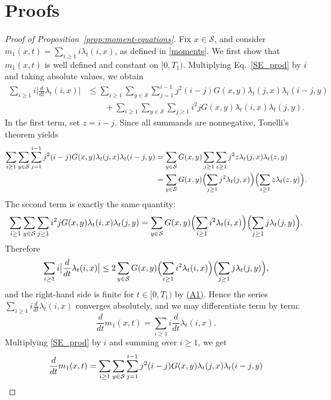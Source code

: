 \documentclass[12pt,twoside]{article}
\begin{document}
\section{Proofs}\label{sec:proofs}
\begin{proof}[Proof of Proposition~\ref{prop:moment-equations}]
Fix $x\in\mathcal S$, and consider
$
m_1(x,t)=\sum_{i\ge1} i\lambda_t(i,x)$, as defined in \eqref{moments}.
We first show that $m_1(x,t)$ is well defined and constant on $[0,T_1)$.
Multiplying Eq.~\eqref{SE_prod} by $i$ and taking absolute values, we obtain
\begin{align*}
\sum_{i\ge1} i\bigl|\frac{d}{dt} \lambda_t(i,x)\bigr|
&\le
\sum_{i\ge1}\sum_{y\in\mathcal S}\sum_{j=1}^{i-1}
j^2(i-j)G(x,y)\lambda_t(j,x)\lambda_t(i-j,y)
\\
&\qquad
+\sum_{i\ge1}\sum_{y\in\mathcal S}\sum_{j\ge1}
i^2j G(x,y)\lambda_t(i,x)\lambda_t(j,y).
\end{align*}
In the first term, set $z=i-j$. Since all summands are nonnegative,
Tonelli's theorem yields
\begin{align*}
\sum_{i\ge1}\sum_{y\in\mathcal S}\sum_{j=1}^{i-1}
j^2(i-j)G(x,y)\lambda_t(j,x)\lambda_t(i-j,y)
&=
\sum_{y\in\mathcal S} G(x,y)
\sum_{j\ge1}\sum_{z\ge1}
j^2 z\lambda_t(j,x)\lambda_t(z,y)
\\
&=
\sum_{y\in\mathcal S} G(x,y)
\Bigl(\sum_{j\ge1} j^2\lambda_t(j,x)\Bigr)
\Bigl(\sum_{z\ge1} z\lambda_t(z,y)\Bigr).
\end{align*}
The second term is exactly the same quantity:
$$
\sum_{i\ge1}\sum_{y\in\mathcal S}\sum_{j\ge1}
i^2jG(x,y)\lambda_t(i,x)\lambda_t(j,y)
=
\sum_{y\in\mathcal S} G(x,y)
\Bigl(\sum_{i\ge1} i^2\lambda_t(i,x)\Bigr)
\Bigl(\sum_{j\ge1} j\lambda_t(j,y)\Bigr).
$$
Therefore
\begin{equation}
\label{eq:abs-der-bound}
\sum_{i\ge1} i\bigl|\frac{d}{dt} \lambda_t(i,x)\bigr|
\le
2\sum_{y\in\mathcal S} G(x,y)
\Bigl(\sum_{i\ge1} i^2\lambda_t(i,x)\Bigr)
\Bigl(\sum_{j\ge1} j\lambda_t(j,y)\Bigr),
\end{equation}
and the right-hand side is finite for $t\in[0,T_1)$ by \hyperlink{ass:A1}{(A1)}. Hence the series
$\sum_{i\ge1} i\frac{d}{dt}\lambda_t(i,x)$ converges absolutely, and we may differentiate term by term:
$$
\frac{d}{dt}m_1(x,t)=\sum_{i\ge1} i\frac{d}{dt}\lambda_t(i,x).
$$
Multiplying \eqref{SE_prod} by $i$ and summing over $i\ge1$, we get
\begin{align}
\frac{d}{dt}m_1(x,t)
&=
\sum_{i\ge1}\sum_{y\in\mathcal S}\sum_{j=1}^{i-1}
j^2(i-j)G(x,y)\lambda_t(j,x)\lambda_t(i-j,y)
\notag\\

\end{align}
\end{proof}
\end{document}
